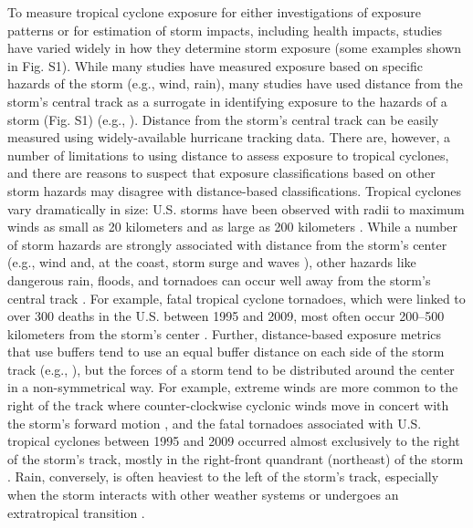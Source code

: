 \documentclass[fleqn,10pt,lineno]{olplainarticle}
\begin{document}
To measure tropical cyclone exposure for either investigations of exposure
patterns or for estimation of storm impacts, including health impacts, studies
have varied widely in how they determine storm exposure (some examples shown in
Fig. S1). While many studies have measured exposure based on specific hazards
of the storm (e.g., wind, rain), many studies have used distance from the
storm's central track as a surrogate in identifying exposure to the hazards of
a storm (Fig. S1) (e.g., \citep{czajkowski2011, tansel2010, kinney2008,
caillouet2008increase}). Distance from the storm's central track can be easily
measured using widely-available hurricane tracking data. There are, however, a
number of limitations to using distance to assess exposure to tropical
cyclones, and there are reasons to suspect that exposure classifications based
on other storm hazards may disagree with distance-based classifications.
Tropical cyclones vary dramatically in size: U.S. storms have been observed
with radii to maximum winds as small as 20 kilometers and as large as 200
kilometers \citep{mallin2006, quiring2011variations}. While a number of storm
hazards are strongly associated with distance from the storm's center (e.g.,
wind and, at the coast, storm surge and waves \citep{rappaport2000, kruk2010}),
other hazards like dangerous rain, floods, and tornadoes can occur well away
from the storm's central track \citep{rappaport2000, atallah2007, moore2012}.
For example, fatal tropical cyclone tornadoes, which were linked to over 300
deaths in the U.S.  between 1995 and 2009, most often occur 200--500 kilometers
from the storm's center \citep{moore2012}. Further, distance-based exposure
metrics that use buffers tend to use an equal buffer distance on each side of
the storm track (e.g., \citep{czajkowski2011, grabich2015, grabich2016,
zandbergen2009, tansel2010}), but the forces of a storm tend to be distributed
around the center in a non-symmetrical way. For example, extreme winds are more
common to the right of the track where counter-clockwise cyclonic winds move in
concert with the storm's forward motion \citep{halverson2015}, and the fatal
tornadoes associated with U.S. tropical cyclones between 1995 and 2009 occurred
almost exclusively to the right of the storm's track, mostly in the right-front
quandrant (northeast) of the storm \citep{moore2012}. Rain, conversely, is
often heaviest to the left of the storm's track, especially when the storm
interacts with other weather systems \citep{atallah2003, atallah2007,
zhu2013variations} or undergoes an extratropical transition
\citep{elsberry2002}.
\end{document}
